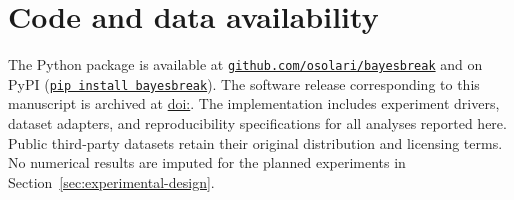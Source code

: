 \section*{Code and data availability}
The \BayesBreak Python package is available at
\href{\ProjectGitHub}{\texttt{github.com/osolari/bayesbreak}} and on PyPI
(\href{\ProjectPyPI}{\texttt{pip install bayesbreak}}).
The software release corresponding to this manuscript is archived at
\href{\ProjectDOIURL}{doi:\ProjectDOI}.
The implementation includes experiment drivers, dataset adapters, and
reproducibility specifications for all analyses reported here.
Public third-party datasets retain their original distribution and licensing
terms. No numerical results are imputed for the planned experiments in
Section~\ref{sec:experimental-design}.
